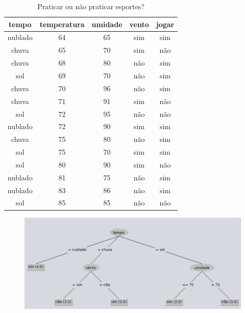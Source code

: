 \documentclass[
    article,            %
    11pt,               %
    oneside,            %
    a4paper,            %
    english,            %
    brazil,             %
    sumario=tradicional,
    ]{abntex2}
\begin{document}
\begin{table}[H]
\centering
\caption{Praticar ou não praticar esportes?}
\begin{tabular}{|c|c|c|c|c|}
\hline
\rowcolor[HTML]{C0C0C0} 
\textbf{tempo} & \textbf{temperatura} & \textbf{umidade} & \textbf{vento} & \textbf{jogar} \\ \hline
nublado        & 64                   & 65               & sim            & sim            \\ \hline
chuva          & 65                   & 70               & sim            & não            \\ \hline
chuva          & 68                   & 80               & não            & sim            \\ \hline
sol            & 69                   & 70               & não            & sim            \\ \hline
chuva          & 70                   & 96               & não            & sim            \\ \hline
chuva          & 71                   & 91               & sim            & não            \\ \hline
sol            & 72                   & 95               & não            & não            \\ \hline
nublado        & 72                   & 90               & sim            & sim            \\ \hline
chuva          & 75                   & 80               & não            & sim            \\ \hline
sol            & 75                   & 70               & sim            & sim            \\ \hline
sol            & 80                   & 90               & sim            & não            \\ \hline
nublado        & 81                   & 75               & não            & sim            \\ \hline
nublado        & 83                   & 86               & não            & sim            \\ \hline
sol            & 85                   & 85               & não            & não            \\ \hline
\end{tabular}
\end{table}

\begin{figure}[H]
    \centering
    \includegraphics[width=\textwidth]{imgs/slides1-tree.pdf}
\end{figure}
\end{document}
